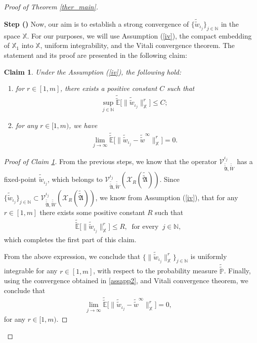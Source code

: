 \documentclass[english,a4paper,11pt]{amsart}
\theoremstyle{plain}
\newtheorem{claim}[theorem]{Claim}
\theoremstyle{definition}
\theoremstyle{remark}
\numberwithin{equation}{section}
\newcounter{lil1}
\newenvironment{step}
{\begin{list} { \bf Step (\Roman{lil1})}
		{ \usecounter{lil1}
			\setlength{\leftmargin}{0.0cm}
			\setlength{\topsep}{0.2cm}
			\setlength{\itemsep}{0.0cm}
			\setlength{\parsep}{0.1cm}
			\setlength{\itemindent}{0.8cm}
			\setlength{\parskip}{0.0cm}}}
	{\end{list}}
\newcounter{lil33}
\newcounter{lil1q}
\newcommand{\MA}{\mathfrak{A}}
\newcommand{\wi}[1]{{\widetilde{#1}}}
\def\wi{\widetilde}
\newcommand{\PP}{{\mathbb{P}}}
\newcommand{\EE}{ \mathbb{E} }
\newcommand{\Vcal} {{\mathcal V}}
\newcommand{\Xcal} {{\mathcal X}}
\newcommand{\N}{\mathbb{N}}
\newcommand{\X}{\mathbb{X}}
\begin{document}
\begin{proof}[Proof of Theorem \ref{ther_main}]
\begin{step}
Now, our aim is to establish a strong convergence of $\{\wi{\wi{w}}_{\iota_j}\}_{j\in\N}$ in the space $\X$. For our purposes, we will use Assumption (\ref{iv}), the compact embedding of $\X_1$ into $\X$, uniform integrability, and the Vitali convergence theorem. 
The statement and its proof are presented in the following claim:
 \begin{claim}\label{uclaim}
 	Under the Assumption (\ref{iv}), the following hold:
 	\begin{enumerate}
 		\item for $r\in [1,m]$, there exists a positive constant $C$ such that 
 		\begin{align*}	
 			\sup_{j\in\N}\wi{\wi{\EE}}\Big[\big\|\wi{\wi{w}}_{{\iota_j}}\big\|_\X^r\Big]\leq C;
 		\end{align*}
 		\item for any $r\in [1,m)$, we have 
 		\begin{align*}	
 			\lim_{j\to\infty}\wi{\wi{\EE}}\Big[\big\|\wi{\wi{w}}_{{\iota_j}}-\wi{\wi{w}}^\infty\big\|_\X^r\Big]=0.
 		\end{align*}
 	\end{enumerate}
 \end{claim}
 \begin{proof}[Proof of Claim \ref{uclaim}]
 	From the previous steps, we know that the operator $\Vcal_{\wi{\wi{\MA}},\wi{\wi{W}}}^{\iota_j}$ has a fixed-point $\wi{\wi{w}}_{{\iota_j}}$, which belongs to $\Vcal_{\wi{\wi{\MA}},\wi{\wi{W}}}^{\iota_j}(\Xcal_R(\wi{\wi{\MA}}))$. Since $\{\wi{\wi{w}}_{{\iota_j}}\}_{j\in\N}\subset \Vcal_{\wi{\wi{\MA}},\wi{\wi{W}}}^{\iota_j}(\Xcal_R(\wi{\wi{\MA}}))$, we know from Assumption (\ref{iv}), that for any $r\in [1,m]$  there exists some positive constant $R$ such that 
 	\begin{align*}	
 		\wi{\wi{\EE}}\Big[\big\|\wi{\wi{w}}_{{\iota_j}}\|_\X^r\Big]\leq R,\ \text{ for every }\ j\in\N,
 	\end{align*}which completes the first part of this claim. 
 	
 	From the above expression, we conclude that $\Big\{\big\|\wi{\wi{w}}_{{\iota_j}}\big\|_\X^r\Big\}_{j\in\N}$ is uniformly integrable for any $r\in[1,m]$, with respect to the probability measure $\wi{\wi{\PP}}$. Finally, using the convergence obtained in \eqref{assapp2}, and Vitali convergence theorem, we conclude that 
 	\begin{align*}	
 		\lim_{j\to\infty}\wi{\wi{\EE}}\Big[\big\|\wi{\wi{w}}_{{\iota_j}}-\wi{\wi{w}}^\infty\big\|_\X^r\Big]=0, 
 	\end{align*}for any $r\in [1,m)$.
 \end{proof}
 

\end{step}
\end{proof}
\end{document}
